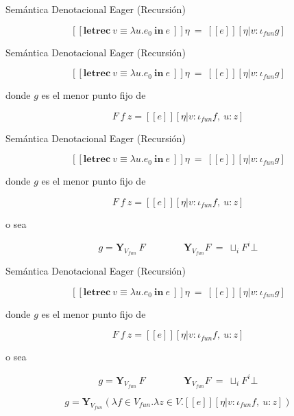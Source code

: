 \documentclass[handout]{beamer}
\newcommand{\letrecin}[2]{\textbf{letrec}\ #1\ \textbf{in}\ #2\ }
\newcommand{\se}[1]{\mbox{$[\![#1]\!]$}}
\begin{document}
\begin{frame}{Semántica Denotacional Eager (Recursión)}

\[\se{\letrecin{v \equiv \lambda u.e_0}{e}} \eta \  = \ \se{ e} [\eta |v:\iota_{fun}g]\]


\end{frame}

\begin{frame}{Semántica Denotacional Eager (Recursión)}

\[\se{\letrecin{v \equiv \lambda u.e_0}{e}} \eta \  = \ \se{ e} [\eta |v:\iota_{fun}g]\]

\bigskip

donde $g$ es el menor punto fijo de 

\[F\ f\ z = \se{e}[\eta| v: \iota_{fun} f,\ u:z]\]

\end{frame}



\begin{frame}{Semántica Denotacional Eager (Recursión)}

\[\se{\letrecin{v \equiv \lambda u.e_0}{e}} \eta \  = \ \se{ e} [\eta |v:\iota_{fun}g]\]

\bigskip

donde $g$ es el menor punto fijo de 

\[F\ f\ z = \se{e}[\eta| v: \iota_{fun} f,\ u:z]\]

o sea 


\[g = \textbf{Y}_{V_{fun}}\ F\qquad\qquad\textbf{Y}_{V_{fun}} F\  =\  \sqcup_i F^i \bot\]

\end{frame}

\begin{frame}{Semántica Denotacional Eager (Recursión)}

\[\se{\letrecin{v \equiv \lambda u.e_0}{e}} \eta \  = \ \se{ e} [\eta |v:\iota_{fun}g]\]

\bigskip

donde $g$ es el menor punto fijo de 

\[F\ f\ z = \se{e}[\eta| v: \iota_{fun} f,\ u:z]\]

o sea 


\[g = \textbf{Y}_{V_{fun}}\ F\qquad\qquad\textbf{Y}_{V_{fun}} F\  =\  \sqcup_i F^i \bot\]


\[g = \textbf{Y}_{V_{fun}}(\lambda f\in V_{fun}.\lambda z\in V.\se{e}[\eta| v: \iota_{fun} f,\ u:z] )\]

\end{frame}
\end{document}
